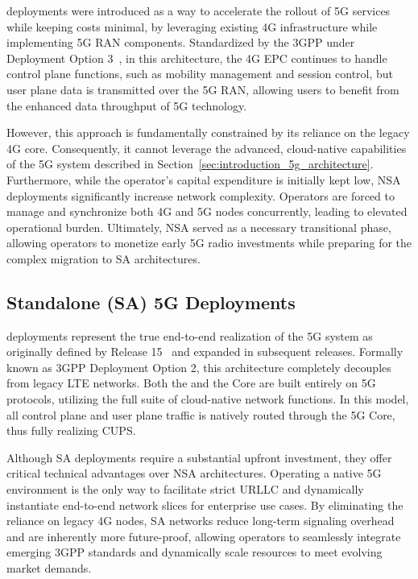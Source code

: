  deployments were introduced as a way to accelerate the rollout of 5G services while keeping costs minimal, by leveraging existing 4G infrastructure while implementing 5G \gls{RAN} components. Standardized by the \gls{3GPP} under Deployment Option 3~\cite{3GPP38801}, in this architecture, the 4G \gls{EPC} continues to handle control plane functions, such as mobility management and session control, but user plane data is transmitted over the 5G \gls{RAN}, allowing users to benefit from the enhanced data throughput of 5G technology.

However, this approach is fundamentally constrained by its reliance on the legacy 4G core. Consequently, it cannot leverage the advanced, cloud-native capabilities of the 5G system described in Section~\ref{sec:introduction_5g_architecture}. Furthermore, while the operator's capital expenditure is initially kept low, \gls{NSA} deployments significantly increase network complexity. Operators are forced to manage and synchronize both 4G and 5G nodes concurrently, leading to elevated operational burden. Ultimately, \gls{NSA} served as a necessary transitional phase, allowing operators to monetize early 5G radio investments while preparing for the complex migration to \gls{SA} architectures.

\subsection{Standalone (SA) 5G Deployments}
\label{sec:sa_deployments}
 deployments represent the true end-to-end realization of the 5G system as originally defined by  Release 15~\cite{3GPPRelease15} and expanded in subsequent releases. Formally known as \gls{3GPP} Deployment Option 2, this architecture completely decouples from legacy \gls{LTE} networks. Both the  and the Core are built entirely on 5G protocols, utilizing the full suite of cloud-native network functions. In this model, all control plane and user plane traffic is natively routed through the 5G Core, thus fully realizing \gls{CUPS}.

Although \gls{SA} deployments require a substantial upfront investment, they offer critical technical advantages over \gls{NSA} architectures. Operating a native 5G environment is the only way to facilitate strict \gls{URLLC} and dynamically instantiate end-to-end network slices for enterprise use cases. By eliminating the reliance on legacy 4G nodes, \gls{SA} networks reduce long-term signaling overhead and are inherently more future-proof, allowing operators to seamlessly integrate emerging \gls{3GPP} standards and dynamically scale resources to meet evolving market demands.

